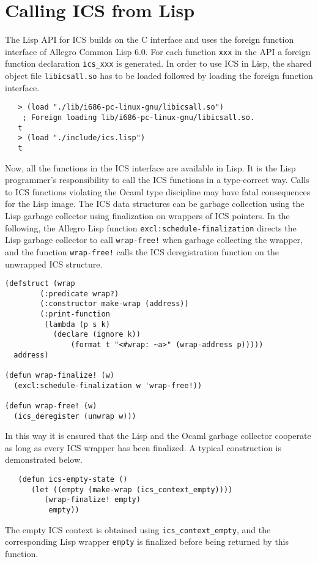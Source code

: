 \documentclass[12pt]{article}
\begin{document}
\section{Calling ICS from Lisp}

The Lisp API for ICS builds on the C interface and uses the foreign
function interface of Allegro Common Lisp 6.0.  For each function
\texttt{xxx} in the API a foreign function declaration \texttt{ics\_xxx}
is generated.  In order to use ICS in Lisp, the shared object file
{\tt libicsall.so} has to be loaded followed by loading the foreign
function interface.
   \begin{verbatim}
   > (load "./lib/i686-pc-linux-gnu/libicsall.so")
    ; Foreign loading lib/i686-pc-linux-gnu/libicsall.so.
   t
   > (load "./include/ics.lisp")
   t
   \end{verbatim}
Now, all the functions in the ICS interface are available in Lisp.
It is the Lisp programmer's responsibility to call the ICS functions
in a type-correct way. Calls to ICS functions violating the Ocaml
type discipline may have fatal consequences for the Lisp image.
The ICS data structures can be garbage collection using the Lisp
garbage collector using finalization on wrappers of ICS pointers.
In the following, the Allegro Lisp function 
{\tt excl:schedule-finalization} directs the Lisp garbage collector
to call {\tt wrap-free!} when garbage collecting the wrapper, and the
function {\tt wrap-free!} calls the ICS deregistration function on
the unwrapped ICS structure.
\begin{verbatim}
(defstruct (wrap
	    (:predicate wrap?)
	    (:constructor make-wrap (address))
	    (:print-function
	     (lambda (p s k)
	       (declare (ignore k))
               (format t "<#wrap: ~a>" (wrap-address p)))))
  address)

(defun wrap-finalize! (w)
  (excl:schedule-finalization w 'wrap-free!))

(defun wrap-free! (w)
  (ics_deregister (unwrap w)))
\end{verbatim}
In this way it is ensured that the Lisp and the Ocaml garbage
collector cooperate as long as every ICS wrapper has been finalized.
A typical construction is demonstrated below.
   \begin{verbatim}
   (defun ics-empty-state ()
      (let ((empty (make-wrap (ics_context_empty))))
         (wrap-finalize! empty)
          empty))
   \end{verbatim}
The empty ICS context is obtained using {\tt ics\_context\_empty},
and the corresponding Lisp wrapper {\tt empty} is finalized before
being returned by this function.
\end{document}
